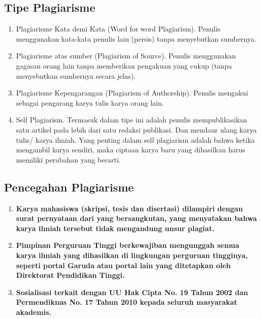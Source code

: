 \documentclass{article}
\begin{document}
\subsection{Tipe Plagiarisme}
\begin{enumerate}
    \item Plagiarisme Kata demi Kata (Word for word Plagiarism). Penulis menggunakan kata-kata penulis lain (persis) tanpa menyebutkan sumbernya. \cite{UNY}
    \item Plagiarisme atas sumber (Plagiarism of Source). Penulis menggunakan gagasan orang lain tanpa memberikan pengakuan yang cukup (tanpa menyebutkan sumbernya secara jelas). \cite{UNY}
    \item Plagiarisme Kepengarangan (Plagiarism of Authorship). Penulis mengakui sebagai pengarang karya tulis karya orang lain. \cite{UNY}
    \item Self Plagiarism. Termasuk dalam tipe ini adalah penulis mempublikasikan satu artikel pada lebih dari satu redaksi publikasi. Dan mendaur ulang karya tulis/ karya ilmiah. Yang penting dalam self plagiarism adalah bahwa ketika mengambil karya sendiri, maka ciptaan karya baru yang dihasilkan harus memiliki perubahan yang berarti. \cite{UNY}
\end{enumerate}

\subsection{Pencegahan Plagiarisme}
\begin{enumerate}
    \item \textbf{Karya mahasiswa (skripsi, tesis dan disertasi) dilampiri dengan surat pernyataan dari
    yang bersangkutan, yang menyatakan bahwa karya ilmiah tersebut tidak mengandung
    unsur plagiat.} \cite{UNY}
    \item \textbf{Pimpinan Perguruan Tinggi berkewajiban mengunggah semua karya ilmiah yang dihasilkan
    di lingkungan perguruan tingginya, seperti portal Garuda atau portal lain
    yang ditetapkan oleh Direktorat Pendidikan Tinggi.} \cite{UNY}
    \item \textbf{Sosialisasi terkait dengan UU Hak Cipta No. 19 Tahun 2002 dan Permendiknas No. 17
    Tahun 2010 kepada seluruh masyarakat akademis.} \cite{UNY}
\end{enumerate}
\end{document}

